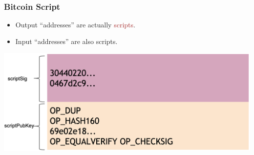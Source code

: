 \documentclass{beamer}
\begin{document}
\begin{frame}
  \frametitle{Bitcoin Script}
  
  \begin{itemize}
  	\item Output ``addresses'' are actually \textcolor{brown}{scripts}.
  	\pause
  	\item Input ``addresses'' are also scripts.
  \end{itemize}
  \pause
  
  \centering
	\includegraphics[scale=0.3]{scripts}
\end{frame}
\end{document}
